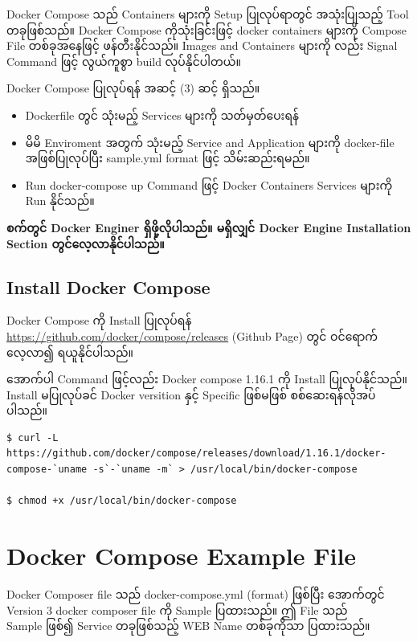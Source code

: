 \documentclass{article}
\begin{document}
Docker Compose သည် Containers များကို Setup ပြုလုပ်ရာတွင် အသုံးပြုသည့်
Tool တခုဖြစ်သည်။ Docker Compose ကိုသုံးခြင်းဖြင့် docker containers
များကို Compose File တစ်ခုအနေဖြင့် ဖန်တီးနိုင်သည်။ Images and Containers
များကို လည်း Signal Command ဖြင့် လွယ်ကူစွာ build လုပ်နိုင်ပါတယ်။

Docker Compose ပြုလုပ်ရန် အဆင့် (3) ဆင့် ရှိသည်။

\begin{itemize}
\itemsep1pt\parskip0pt
\item
  Dockerfile တွင် သုံးမည့် Services များကို သတ်မှတ်ပေးရန်\\
\item
  မိမိ Enviroment အတွက် သုံးမည့် Service and Application များကို
  docker-file အဖြစ်ပြုလုပ်ပြီး sample.yml format ဖြင့် သိမ်းဆည်းရမည်။\\
\item
  Run docker-compose up Command ဖြင့် Docker Containers Services များကို
  Run နိုင်သည်။
\end{itemize}

\textbf{စက်တွင် Docker Enginer ရှိဖို့လိုပါသည်။ မရှိလျှင် Docker Engine
Installation Section တွင်လေ့လာနိုင်ပါသည်။}

\subsection{Install Docker Compose}\label{install-docker-compose}

Docker Compose ကို Install ပြုလုပ်ရန်
\url{https://github.com/docker/compose/releases} (Github Page) တွင်
ဝင်ရောက်လေ့လာ၍ ရယူနိုင်ပါသည်။

အောက်ပါ Command ဖြင့်လည်း Docker compose 1.16.1 ကို Install
ပြုလုပ်နိုင်သည်။ Install မပြုလုပ်ခင် Docker versition နှင့် Specific
ဖြစ်မဖြစ် စစ်ဆေးရန်လိုအပ်ပါသည်။

\begin{verbatim}
$ curl -L https://github.com/docker/compose/releases/download/1.16.1/docker-compose-`uname -s`-`uname -m` > /usr/local/bin/docker-compose

$ chmod +x /usr/local/bin/docker-compose
\end{verbatim}

\pagebreak

\section{Docker Compose Example File}\label{docker-compose-example-file}

Docker Composer file သည် docker-compose.yml (format) ဖြစ်ပြီး အောက်တွင်
Version 3 docker composer file ကို Sample ပြထားသည်။ ဤ File သည်\\Sample
ဖြစ်၍ Service တခုဖြစ်သည့် WEB Name တစ်ခုကိုသာ ပြထားသည်။
\end{document}
